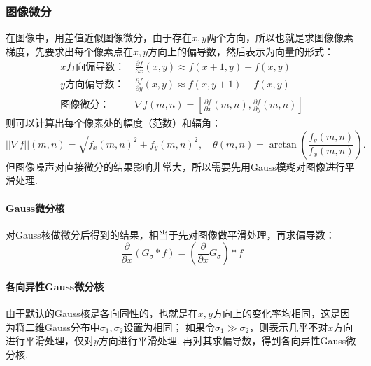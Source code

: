 \documentclass[12pt, a4paper, oneside]{ctexart}
\numberwithin{equation}{section}  %
\theoremstyle{definition}
\begin{document}
\subsubsection{图像微分}
在图像中，用差值近似图像微分，由于存在$x,y$两个方向，所以也就是求图像像素梯度，先要求出每个像素点在$x,y$方向上的偏导数，然后表示为向量的形式：
\begin{align*}
    x\text{方向偏导数：}&\ \frac{\partial f}{\partial x}(x, y)\approx f(x+1,y) - f(x,y)\\
    y\text{方向偏导数：}&\ \frac{\partial f}{\partial y}(x, y)\approx f(x,y+1) - f(x,y)\\
    \text{图像微分：}&\ \nabla f(m, n) = \left[\frac{\partial f}{\partial x}(m,n),\frac{\partial f}{\partial y}(m,n)\right]
\end{align*}
则可以计算出每个像素处的幅度（范数）和辐角：
\begin{equation*}    
||\nabla f||(m,n) = \sqrt{f_x(m,n)^2+f_y(m,n)^2},\quad \theta(m,n) = \arctan\left(\frac{f_y(m,n)}{f_x(m,n)}\right).
\end{equation*}
但图像噪声对直接微分的结果影响非常大，所以需要先用Gauss模糊对图像进行平滑处理.
\paragraph{Gauss微分核}对Gauss核做微分后得到的结果，相当于先对图像做平滑处理，再求偏导数：
\begin{equation*}
    \frac{\partial}{\partial x}(G_\sigma * f) = (\frac{\partial}{\partial x}G_\sigma)*f
\end{equation*}

\paragraph{各向异性Gauss微分核}由于默认的Gauss核是各向同性的，也就是在$x,y$方向上的变化率均相同，这是因为将二维Gauss分布中$\sigma_1,\sigma_2$设置为相同；
如果令$\sigma_1 \gg \sigma_2$，则表示几乎不对$x$方向进行平滑处理，仅对$y$方向进行平滑处理. 再对其求偏导数，得到各向异性Gauss微分核.
\end{document}
